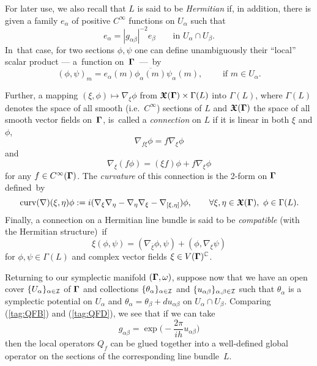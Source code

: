 \documentclass[12pt]{amsart}
\numberwithin{equation}{section}
\theoremstyle{remark}
\newcommand\Omg{{\bigam}}   %
\newcommand\curv{\operatorname{curv}}
\newcommand{\CC}{\C}
\newcommand{\bigam}{\mbox{\boldmath $\Gamma$}}
\newcommand{\bfrakX}{\mbox{\boldmath $\mathfrak X$}}
\newcommand{\C}{\mathbb C}
\begin{document}
For later use, we also recall that $L$ is said to be {\it Hermitian\/} if, in
addition, there is given a family $e_\alpha$ of positive $C^\infty$ functions
on $U_\alpha$ such that
$$ e_\alpha = |g_{\alpha\beta}|^{-2} e_\beta \qquad
\text{in }U_\alpha\cap U_\beta.  $$
In~that case, for two sections $\phi,\psi$ one can define unambiguously their
``local'' scalar product --- a~function on~$\Omg$~---~by
$$ (\phi,\psi)_m = e_\alpha(m) \overline{\phi_\alpha(m)}\psi_\alpha(m),
\qquad\text{ if } m\in U_\alpha.  $$

Further, a mapping $(\xi,\phi)\mapsto\nabla_\xi \phi$ from $\bfrakX(\Omg)\times
\Gamma(L)$ into $\Gamma(L)$, where $\Gamma(L)$ denotes the space of all smooth
(i.e.~$C^\infty$) sections of $L$ and $\bfrakX(\Omg)$ the space of all smooth
vector fields on~$\Omg$, is~called a {\it connection\/} on $L$ if it is linear
in both $\xi$ and $\phi$,
\begin{equation}  \nabla_{f\xi}\phi=f \nabla_\xi\phi  \label{tag:QFEa}
\end{equation}
and
\begin{equation}  \nabla_\xi (f\phi) = (\xi f)\phi + f\nabla_\xi \phi
\label{tag:QFEb}  \end{equation}
for any $f\in C^\infty(\Omg)$. The {\it curvature\/} of this connection is the
2-form on $\Omg$ defined~by
\begin{equation}  \curv(\nabla)(\xi,\eta)\phi := i(\nabla_\xi
\nabla_\eta-\nabla_\eta \nabla_\xi -\nabla_{[\xi,\eta]} ) \phi, \qquad \forall
\xi,\eta\in \bfrakX(\Omg),\ \phi\in\Gamma(L).  \label{tag:QFEc} \end{equation}
Finally, a connection on a Hermitian line bundle is said to be {\sl
compatible\/} (with the Hermitian structure)~if
\begin{equation}  \xi (\phi,\psi) = (\nabla_{\overline\xi} \phi,\psi) +
(\phi,\nabla_\xi \psi)  \label{tag:QFF}  \end{equation}
for $\phi,\psi\in\Gamma(L)$ and complex vector fields $\xi\in V(\Omg)^\CC$.

Returning to our symplectic manifold $(\Omg,\omega)$, suppose now that we have
an open cover $\{U_\alpha\}_{\alpha\in\mathcal I}$ of $\Omg$ and collections
$\{\theta_ \alpha\}_{\alpha\in\mathcal I}$ and
$\{u_{\alpha\beta}\}_{\alpha,\beta\in\mathcal I}$
such that $\theta_\alpha$ is a symplectic potential on $U_\alpha$ and $\theta_
\alpha=\theta_\beta+du_{\alpha\beta}$ on $U_\alpha\cap U_\beta$. Comparing
(\ref{tag:QFB}) and (\ref{tag:QFD}), we see that if we can take
\begin{equation}  g_{\alpha\beta}=\exp\Big(-\frac{2\pi}{ih}
u_{\alpha\beta}\Big)  \label{tag:QFG} \end{equation}
then the local operators $Q_f$ can be glued together into a well-defined global
operator on the sections of the corresponding line bundle~$L$.
\end{document}
